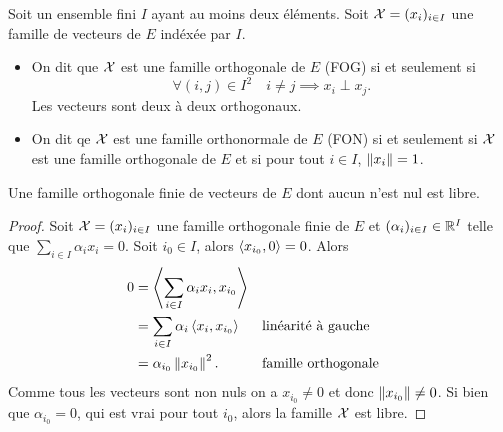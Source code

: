 \begin{defdef}
  Soit un ensemble fini $I$ ayant au moins deux éléments. Soit $\mathcal{X}=(x_i)_{i \in I}$ une famille de vecteurs de $E$ indéxée par $I$.
  \begin{itemize}
  \item On dit que $\mathcal{X}$ est une famille orthogonale de $E$ (FOG) si et seulement si
    \begin{equation}
      \forall (i,j) \in I^2 \quad i\neq j \implies x_i \perp x_j.
    \end{equation}
    Les vecteurs sont deux à deux orthogonaux.
  \item On dit qe $\mathcal{X}$ est une famille orthonormale de $E$ (FON) si et seulement si $\mathcal{X}$ est une famille orthogonale de $E$ et si pour tout $i \in I$, $\left\lVert x_i\right\rVert=1$.
  \end{itemize}
\end{defdef}

\begin{prop}
  Une famille orthogonale finie de vecteurs de $E$ dont aucun n'est nul est libre.
\end{prop}
\begin{proof}
  Soit $\mathcal{X}=(x_i)_{i \in I}$ une famille orthogonale finie de $E$ et $(\alpha_i)_{i \in I} \in \mathbb{R}^I$ telle que $\sum_{i \in I}\alpha_i x_i=0$. Soit $i_0 \in I$, alors $\left\langle{x_{i_0}},{0}\right\rangle=0$. Alors
  \begin{align}
    0 &=\left\langle{\sum_{i \in I}\alpha_i x_i},{x_{i_0}}\right\rangle \\
    &=\sum_{i \in I}\alpha_i \left\langle{x_i},{x_{i_0}}\right\rangle && \text{linéarité à gauche}\\
    &=\alpha_{i_0} \left\lVert x_{i_0}\right\rVert^2. && \text{famille orthogonale}
  \end{align}
  Comme tous les vecteurs sont non nuls on a $x_{i_0}\neq 0$ et donc $\left\lVert x_{i_0}\right\rVert \neq 0$. Si bien que $\alpha_{i_0}=0$, qui est vrai pour tout $i_0$, alors la famille $\mathcal{X}$ est libre.
\end{proof}

